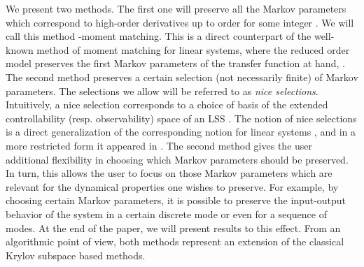 \documentclass[journal]{IEEEtran}
\begin{document}
We present two methods. The first one will preserve all the Markov parameters which correspond to high-order derivatives up to order  for some integer . We will call this method -moment matching. This is a direct counterpart of the well-known method of moment matching for linear systems, where the  reduced order model preserves the first  Markov parameters of the transfer function at hand, \cite{antoulas}. The second method preserves a certain selection (not necessarily finite) of Markov parameters. The selections we allow will be referred to as \emph{nice selections}. Intuitively, a nice selection corresponds to a choice of basis of the extended controllability (resp. observability) space of an LSS \cite{Sun:Book,MP:BigArticlePartI}. The notion of nice selections is a direct generalization of the corresponding notion for linear systems \cite{Hazewinkel1,gugercin}, and in a more restricted form it appeared in \cite{petreczkypeeters1}. The second method gives the user additional flexibility in choosing
which Markov parameters should be preserved. In turn, this allows the user to focus on those Markov parameters which are relevant for the dynamical properties one wishes to preserve. For example, by choosing certain Markov parameters, it is possible to preserve the input-output behavior of the system in a certain discrete mode or even for a sequence of modes. At the end of the paper, we will present results to this effect. 
From an algorithmic point of view, both methods represent an extension of the classical Krylov subspace  based methods. 
\end{document}
